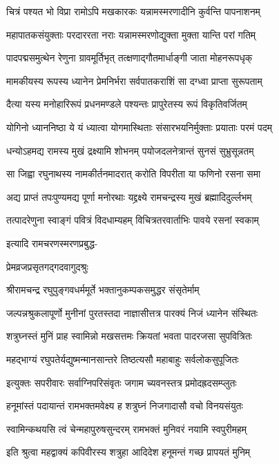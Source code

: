 \twolineshloka
{चित्रं पश्यत भो विप्रा रामोऽपि मखकारकः}
{यन्नामस्मरणादीनि कुर्वन्ति पापनाशनम्}%

\twolineshloka
{महापातकसंयुक्ताः परदाररता नराः}
{यन्नामस्मरणोद्युक्ता मुक्ता यान्ति परां गतिम्}%

\twolineshloka
{पादपद्मसमुत्थेन रेणुना ग्रावमूर्तिभृत्}
{तत्क्षणाद्गौतमार्धाङ्गी जाता मोहनरूपधृक्}%

\twolineshloka
{मामकीयस्य रूपस्य ध्यानेन प्रेमनिर्भरा}
{सर्वपातकराशिं सा दग्ध्वा प्राप्ता सुरूपताम्}%

\twolineshloka
{दैत्या यस्य मनोहारिरूपं प्रधनमण्डले}
{पश्यन्तः प्रापुरेतस्य रूपं विकृतिवर्जितम्}%

\twolineshloka
{योगिनो ध्याननिष्ठा ये यं ध्यात्वा योगमास्थिताः}
{संसारभयनिर्मुक्ताः प्रयाताः परमं पदम्}%

\twolineshloka
{धन्योऽहमद्य रामस्य मुखं द्रक्ष्यामि शोभनम्}
{पयोजदलनेत्रान्तं सुनसं सुभ्रुसून्नतम्}%

\twolineshloka
{सा जिह्वा रघुनाथस्य नामकीर्तनमादरात्}
{करोति विपरीता या फणिनो रसना समा}%

\twolineshloka
{अद्य प्राप्तं तपःपुण्यमद्य पूर्णा मनोरथाः}
{यद्द्रक्ष्ये रामचन्द्रस्य मुखं ब्रह्मादिदुर्ल्लभम्}%

\twolineshloka
{तत्पादरेणुना स्वाङ्गं पवित्रं विदधाम्यहम्}
{विचित्रतरवार्ताभिः पावये रसनां स्वकाम्}%

इत्यादि रामचरणस्मरणप्रबुद्ध-

प्रेमव्रजप्रसृतगद्गदवागुदश्रुः

\twolineshloka
{श्रीरामचन्द्र रघुपुङ्गवधर्ममूर्ते}
{भक्तानुकम्पकसमुद्धर संसृतेर्माम्}%

\twolineshloka
{जल्पन्नश्रुकलापूर्णो मुनीनां पुरतस्तदा}
{नाज्ञासीत्तत्र पारक्यं निजं ध्यानेन संस्थितः}%

\twolineshloka
{शत्रुघ्नस्तं मुनिं प्राह स्वामिन्नो मखसत्तमः}
{क्रियतां भवता पादरजसा सुपवित्रितः}%

\twolineshloka
{महद्भाग्यं रघुपतेर्यद्युष्मन्मानसान्तरे}
{तिष्ठत्यसौ महाबाहुः सर्वलोकसुपूजितः}%

\twolineshloka
{इत्युक्तः सपरीवारः सर्वाग्निपरिसंवृतः}
{जगाम च्यवनस्तत्र प्रमोदह्रदसम्प्लुतः}%

\twolineshloka
{हनूमांस्तं पदायान्तं रामभक्तमवेक्ष्य ह}
{शत्रुघ्नं निजगादासौ वचो विनयसंयुतः}%

\twolineshloka
{स्वामिन्कथयसि त्वं चेन्महापुरुषसुन्दरम्}
{रामभक्तं मुनिवरं नयामि स्वपुरीमहम्}%

\twolineshloka
{इति श्रुत्वा महद्वाक्यं कपिवीरस्य शत्रुहा}
{आदिदेश हनूमन्तं गच्छ प्रापयतं मुनिम्}%

